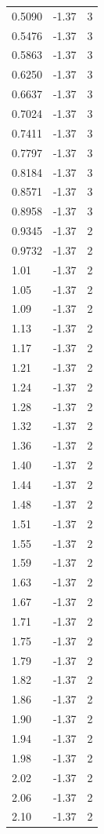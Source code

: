 \begin{longtable}{lrr}
  0.5090 & -1.37 & 3 \\
  0.5476 & -1.37 & 3 \\
  0.5863 & -1.37 & 3 \\
  0.6250 & -1.37 & 3 \\
  0.6637 & -1.37 & 3 \\
  0.7024 & -1.37 & 3 \\
  0.7411 & -1.37 & 3 \\
  0.7797 & -1.37 & 3 \\
  0.8184 & -1.37 & 3 \\
  0.8571 & -1.37 & 3 \\
  0.8958 & -1.37 & 3 \\
  0.9345 & -1.37 & 2 \\
  0.9732 & -1.37 & 2 \\
  1.01 & -1.37 & 2 \\
  1.05 & -1.37 & 2 \\
  1.09 & -1.37 & 2 \\
  1.13 & -1.37 & 2 \\
  1.17 & -1.37 & 2 \\
  1.21 & -1.37 & 2 \\
  1.24 & -1.37 & 2 \\
  1.28 & -1.37 & 2 \\
  1.32 & -1.37 & 2 \\
  1.36 & -1.37 & 2 \\
  1.40 & -1.37 & 2 \\
  1.44 & -1.37 & 2 \\
  1.48 & -1.37 & 2 \\
  1.51 & -1.37 & 2 \\
  1.55 & -1.37 & 2 \\
  1.59 & -1.37 & 2 \\
  1.63 & -1.37 & 2 \\
  1.67 & -1.37 & 2 \\
  1.71 & -1.37 & 2 \\
  1.75 & -1.37 & 2 \\
  1.79 & -1.37 & 2 \\
  1.82 & -1.37 & 2 \\
  1.86 & -1.37 & 2 \\
  1.90 & -1.37 & 2 \\
  1.94 & -1.37 & 2 \\
  1.98 & -1.37 & 2 \\
  2.02 & -1.37 & 2 \\
  2.06 & -1.37 & 2 \\
  2.10 & -1.37 & 2 \\

\end{longtable}
